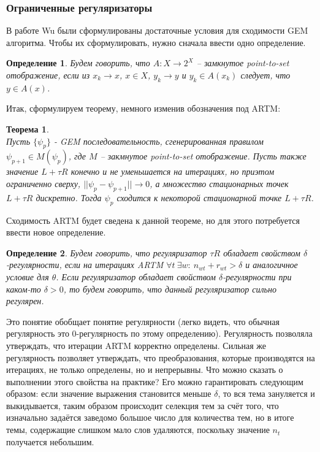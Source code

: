 \documentclass[12pt]{article}
\newtheorem{definition}{Определение}[section]
\newtheorem{theorem}{Теорема}
\begin{document}
	\subsubsection{Ограниченные регуляризаторы}
	 В работе Wu \cite{wuem} были сформулированы достаточные условия для сходимости GEM алгоритма. Чтобы их сформулировать, нужно сначала ввести одно определение.
	\begin{definition}
	Будем говорить, что $A\colon X \to 2^X$ -- замкнутое point-to-set отображение, если из $x_k \to x$, $x \in X$, $y_k \to y$ и $y_k \in A(x_k)$ следует, что $y \in A(x)$.
	\end{definition}
	Итак, сформулируем теорему, немного изменив обозначения под ARTM:
	\begin{theorem} \label{theorem_wu} \ \\
	Пусть $\{\psi_p\}$ - GEM последовательность, сгенерированная правилом $\psi_{p+1} \in M(\psi_p)$, где $M$ -- закмнутое point-to-set отображение. Пусть также значение $L + \tau R$ конечно и не уменьшается на итерациях, но приэтом ограниченно сверху, $|| \psi_p - \psi_{p+1}|| \to 0$, а множество стационарных точек $L + \tau R$ дискретно. Тогда $\psi_p$ сходится к некоторой стационарной точке $L + \tau R$.
	\end{theorem}
	Сходимость ARTM будет сведена к данной теореме, но для этого потребуется ввести новое определение.
	\begin{definition}
	\label{strongreg}
	Будем говорить, что регуляризатор $\tau R$ обладает свойством $\delta$-регулярности, если на итерациях ARTM $\forall t~\exists w \colon~n_{wt} + r_{wt} > \delta$ и аналогичное условие для $\theta$. Если регуляризатор  обладает свойством $\delta$-регулярности при каком-то $\delta > 0$, то будем говорить, что данный регуляризатор сильно регулярен.
	\end{definition}
	Это понятие обобщает понятие регулярности (легко видеть, что обычная регулярность это 0-регулярность по этому определению). Регулярность позволяла утверждать, что итерации ARTM корректно определены. Сильная же регулярность позволяет утверждать, что преобразования, которые производятся на итерациях, не только определены, но и непрерывны. Что можно сказать о выполнении этого свойства на практике? Его можно гарантировать следующим образом: если значение выражения становится меньше $\delta$, то вся тема зануляется  и выкидывается, таким образом происходит селекция тем за счёт того, что изначально задаётся заведомо большое число для количества тем, но в итоге темы, содержащие слишком мало слов удаляются, поскольку значение $n_t$ получается небольшим.
\end{document}
